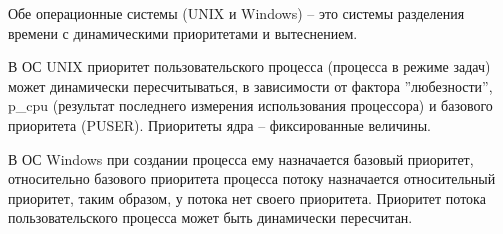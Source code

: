 Обе операционные системы (UNIX и Windows) -- это системы разделения времени с  динамическими приоритетами и вытеснением.

В ОС UNIX приоритет пользовательского процесса (процесса в режиме задач) может динамически пересчитываться, в зависимости от фактора ''любезности'', p\_cpu (результат последнего измерения использования процессора) и базового приоритета (PUSER). Приоритеты ядра -- фиксированные величины.

В ОС Windows при создании процесса ему назначается базовый приоритет, относительно базового приоритета процесса потоку назначается относительный приоритет, таким образом, у потока нет своего приоритета. Приоритет потока пользовательского процесса может быть динамически пересчитан.











